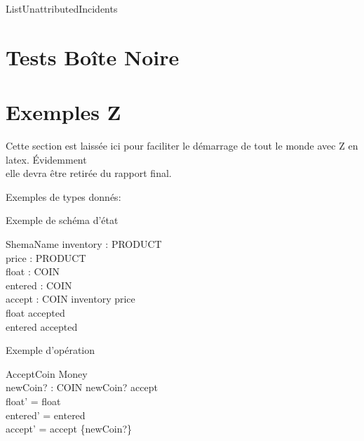\documentclass[12pt]{article}
\begin{document}
\begin{schema}{ListUnattributedIncidents}
  \where
\end{schema}

\section{Tests Boîte Noire}




\section{Exemples Z}
Cette section est laissée ici pour faciliter le démarrage de tout le monde avec Z en latex.  Évidemment\\ elle devra être retirée du rapport final.

Exemples de types donnés:
\begin{zed}
\end{zed}


Exemple de schéma d'état
\begin{schema}{ShemaName}
  inventory : \bag PRODUCT\\
  price : PRODUCT \pfun \nat\\
  float : \bag COIN\\
  entered : \bag COIN\\
  accept : \power COIN
  \where
  \dom inventory \subseteq \dom price\\
  \dom float \subseteq accepted\\
  \dom entered \subseteq accepted
\end{schema}

Exemple d'opération
\begin{schema}{AcceptCoin}
\Delta Money\\
newCoin? : COIN
\where
newCoin? \notin accept\\
float' = float\\
entered' = entered\\
accept' = accept \cup \{newCoin?\}
\end{schema}
\end{document}

